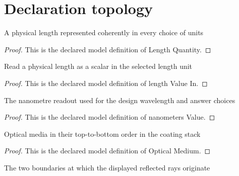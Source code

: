\section{Declaration topology}
\begin{definition}
  \label{def:physics:phyx-mini-0128:phyxminiproblems-problemphyxmini0128-lengthquantity}
  A physical length represented coherently in every choice of units
\end{definition}
\begin{proof}
  This is the declared model definition of Length Quantity.
\end{proof}
\begin{definition}
  \label{def:physics:phyx-mini-0128:phyxminiproblems-problemphyxmini0128-lengthvaluein}
  Read a physical length as a scalar in the selected length unit
\end{definition}
\begin{proof}
  This is the declared model definition of length Value In.
\end{proof}
\begin{definition}
  \label{def:physics:phyx-mini-0128:phyxminiproblems-problemphyxmini0128-nanometersvalue}
  The nanometre readout used for the design wavelength and answer choices
\end{definition}
\begin{proof}
  This is the declared model definition of nanometers Value.
\end{proof}
\begin{definition}
  \label{def:physics:phyx-mini-0128:phyxminiproblems-problemphyxmini0128-opticalmedium}
  Optical media in their top-to-bottom order in the coating stack
\end{definition}
\begin{proof}
  This is the declared model definition of Optical Medium.
\end{proof}
\begin{definition}
  \label{def:physics:phyx-mini-0128:phyxminiproblems-problemphyxmini0128-filminterface}
  The two boundaries at which the displayed reflected rays originate
\end{definition}

